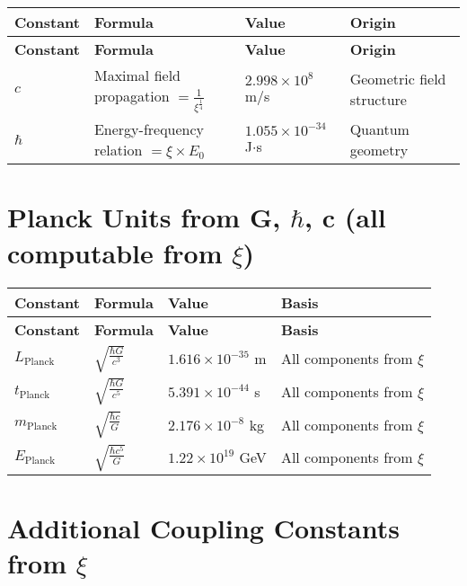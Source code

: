 \documentclass[12pt,a4paper]{article}
\begin{document}
	\begin{longtable}{|p{3cm}|p{5cm}|p{4cm}|p{3cm}|}
		\hline
		\textbf{Constant} & \textbf{Formula} & \textbf{Value} & \textbf{Origin} \\
		\hline
		\endfirsthead
		\hline
		\textbf{Constant} & \textbf{Formula} & \textbf{Value} & \textbf{Origin} \\
		\hline
		\endhead
		\(c\) & Maximal field propagation \(= \frac{1}{\xi^{\frac{1}{4}}}\) & \(2.998 \times 10^{8}\) m/s & Geometric field structure \\
		\hline
		\(\hbar\) & Energy-frequency relation \(= \xi \times E_0\) & \(1.055 \times 10^{-34}\) J\(\cdot\)s & Quantum geometry \\
		\hline
	\end{longtable}
	
	\section{Planck Units from G, \(\hbar\), c (all computable from \(\xi\))}
	
	\begin{longtable}{|p{3cm}|p{4cm}|p{4cm}|p{3cm}|}
		\hline
		\textbf{Constant} & \textbf{Formula} & \textbf{Value} & \textbf{Basis} \\
		\hline
		\endfirsthead
		\hline
		\textbf{Constant} & \textbf{Formula} & \textbf{Value} & \textbf{Basis} \\
		\hline
		\endhead
		\(L_{\text{Planck}}\) & \(\sqrt{\frac{\hbar G}{c^{3}}}\) & \(1.616 \times 10^{-35}\) m & All components from \(\xi\) \\
		\hline
		\(t_{\text{Planck}}\) & \(\sqrt{\frac{\hbar G}{c^{5}}}\) & \(5.391 \times 10^{-44}\) s & All components from \(\xi\) \\
		\hline
		\(m_{\text{Planck}}\) & \(\sqrt{\frac{\hbar c}{G}}\) & \(2.176 \times 10^{-8}\) kg & All components from \(\xi\) \\
		\hline
		\(E_{\text{Planck}}\) & \(\sqrt{\frac{\hbar c^{5}}{G}}\) & \(1.22 \times 10^{19}\) GeV & All components from \(\xi\) \\
		\hline
	\end{longtable}
	
	\section{Additional Coupling Constants from \(\xi\)}
	
\end{document}
